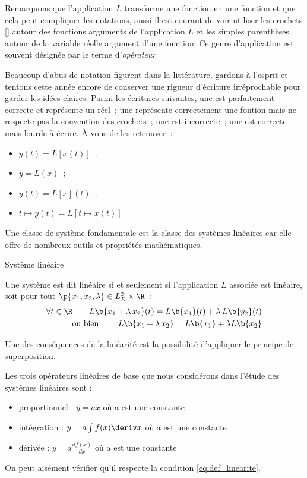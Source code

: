 \begin{remarque}{}
  Remarquons que l'application $L$ transforme une fonction en
  une fonction et que cela peut compliquer les notations,
  aussi il est courant de voir utiliser les crochets [] autour
  des fonctions arguments de l'application $L$ et les simples
  parenthèses autour de la variable réelle argument d'une
  fonction. Ce genre d'application est souvent désignée par le
  terme d'\emph{opérateur}
  
  
  Beaucoup d'abus de notation figurent dans la littérature,
  gardons à l'esprit et tentons cette année encore de
  conserver une rigueur d'écriture irréprochable pour garder
  les idées claires. Parmi les écritures suivantes, une est
  parfaitement correcte et représente un réel~; une représente
  correctement une fontion mais ne respecte pas la convention
  des crochets~; une est incorrecte~; une est correcte mais
  lourde à écrire. À vous de les retrouver~:
  \begin{itemize}
  \item $y(t) = L[x(t)]$~;
  \item $y = L(x)$~;
  \item $y(t) = L[x](t)$~;
  \item $t\mapsto y(t) = L[t\mapsto x(t)]$
  \end{itemize}{}
\end{remarque}

Une classe de système fondamentale est la classe des systèmes
linéaires car elle offre de nombreux outils et propriétés
mathématiques.
\begin{definition}{Système linéaire}
  \label{def:linearite}
  
  Une système est dit linéaire si et seulement si
  l'application $L$ associée est linéaire, soit pour tout
  $\p{x_1,x_2,\lambda} \in L_E^2 \times \R$~:
  \begin{eqnarray}
    \label{eq:def_linearite}
    \forall t \in \R \qquad L\b{x_1 + \lambda\, x_2}(t) = L\b{x_1}(t) + \lambda\,L\b{y_2}(t) \nonumber\\
    \text{ou bien } \qquad L\b{x_1 + \lambda\,x_2} = L\b{x_1} +\lambda L\b{x_2 }
  \end{eqnarray}
\end{definition}


Une des conséquences de la linéarité est la possibilité
d'appliquer le principe de superposition.

Les trois opérateurs linéaires de base que nous considérons
dans l'étude des systèmes linéaires sont :
\begin{itemize}
\item proportionnel : $y = a x$ où a est une constante
\item intégration : $y = a \int f(x) \deriv x $ où a est
  une constante
\item dérivée : $y = a \frac{df(x)}{dx} $ où a est une
  constante
\end{itemize}
On peut aisément vérifier qu'il respecte la condition
\ref{eq:def_linearite}.


